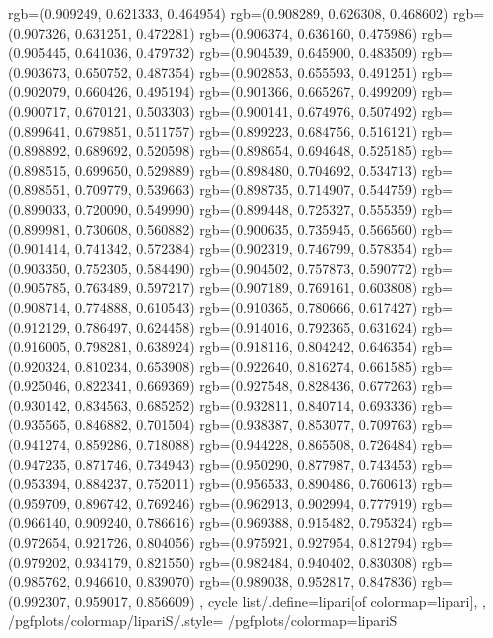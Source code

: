 {{{					rgb=(0.909249, 0.621333, 0.464954)
					rgb=(0.908289, 0.626308, 0.468602)
					rgb=(0.907326, 0.631251, 0.472281)
					rgb=(0.906374, 0.636160, 0.475986)
					rgb=(0.905445, 0.641036, 0.479732)
					rgb=(0.904539, 0.645900, 0.483509)
					rgb=(0.903673, 0.650752, 0.487354)
					rgb=(0.902853, 0.655593, 0.491251)
					rgb=(0.902079, 0.660426, 0.495194)
					rgb=(0.901366, 0.665267, 0.499209)
					rgb=(0.900717, 0.670121, 0.503303)
					rgb=(0.900141, 0.674976, 0.507492)
					rgb=(0.899641, 0.679851, 0.511757)
					rgb=(0.899223, 0.684756, 0.516121)
					rgb=(0.898892, 0.689692, 0.520598)
					rgb=(0.898654, 0.694648, 0.525185)
					rgb=(0.898515, 0.699650, 0.529889)
					rgb=(0.898480, 0.704692, 0.534713)
					rgb=(0.898551, 0.709779, 0.539663)
					rgb=(0.898735, 0.714907, 0.544759)
					rgb=(0.899033, 0.720090, 0.549990)
					rgb=(0.899448, 0.725327, 0.555359)
					rgb=(0.899981, 0.730608, 0.560882)
					rgb=(0.900635, 0.735945, 0.566560)
					rgb=(0.901414, 0.741342, 0.572384)
					rgb=(0.902319, 0.746799, 0.578354)
					rgb=(0.903350, 0.752305, 0.584490)
					rgb=(0.904502, 0.757873, 0.590772)
					rgb=(0.905785, 0.763489, 0.597217)
					rgb=(0.907189, 0.769161, 0.603808)
					rgb=(0.908714, 0.774888, 0.610543)
					rgb=(0.910365, 0.780666, 0.617427)
					rgb=(0.912129, 0.786497, 0.624458)
					rgb=(0.914016, 0.792365, 0.631624)
					rgb=(0.916005, 0.798281, 0.638924)
					rgb=(0.918116, 0.804242, 0.646354)
					rgb=(0.920324, 0.810234, 0.653908)
					rgb=(0.922640, 0.816274, 0.661585)
					rgb=(0.925046, 0.822341, 0.669369)
					rgb=(0.927548, 0.828436, 0.677263)
					rgb=(0.930142, 0.834563, 0.685252)
					rgb=(0.932811, 0.840714, 0.693336)
					rgb=(0.935565, 0.846882, 0.701504)
					rgb=(0.938387, 0.853077, 0.709763)
					rgb=(0.941274, 0.859286, 0.718088)
					rgb=(0.944228, 0.865508, 0.726484)
					rgb=(0.947235, 0.871746, 0.734943)
					rgb=(0.950290, 0.877987, 0.743453)
					rgb=(0.953394, 0.884237, 0.752011)
					rgb=(0.956533, 0.890486, 0.760613)
					rgb=(0.959709, 0.896742, 0.769246)
					rgb=(0.962913, 0.902994, 0.777919)
					rgb=(0.966140, 0.909240, 0.786616)
					rgb=(0.969388, 0.915482, 0.795324)
					rgb=(0.972654, 0.921726, 0.804056)
					rgb=(0.975921, 0.927954, 0.812794)
					rgb=(0.979202, 0.934179, 0.821550)
					rgb=(0.982484, 0.940402, 0.830308)
					rgb=(0.985762, 0.946610, 0.839070)
					rgb=(0.989038, 0.952817, 0.847836)
					rgb=(0.992307, 0.959017, 0.856609)
			},
		cycle list/.define={lipari}{[of colormap=lipari]},
		},
		/pgfplots/colormap/lipariS/.style={
			/pgfplots/colormap={lipariS}{%
}}}
